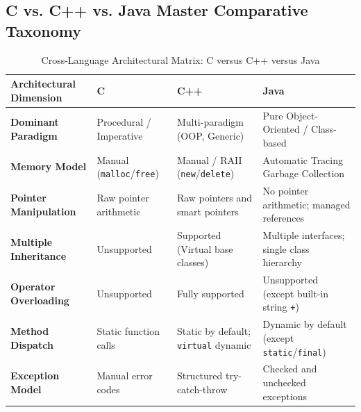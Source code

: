 \subsection{C vs. C++ vs. Java Master Comparative Taxonomy}
\begin{table}[htbp]
\centering
\small
\begin{tabularx}{\textwidth}{l X X X}
\toprule
\textbf{Architectural Dimension} & \textbf{C} & \textbf{C++} & \textbf{Java} \\
\midrule
\textbf{Dominant Paradigm} & Procedural / Imperative & Multi-paradigm (OOP, Generic) & Pure Object-Oriented / Class-based \\
\textbf{Memory Model} & Manual (\texttt{malloc}/\texttt{free}) & Manual / RAII (\texttt{new}/\texttt{delete}) & Automatic Tracing Garbage Collection \\
\textbf{Pointer Manipulation} & Raw pointer arithmetic & Raw pointers and smart pointers & No pointer arithmetic; managed references \\
\textbf{Multiple Inheritance} & Unsupported & Supported (Virtual base classes) & Multiple interfaces; single class hierarchy \\
\textbf{Operator Overloading} & Unsupported & Fully supported & Unsupported (except built-in string \texttt{+}) \\
\textbf{Method Dispatch} & Static function calls & Static by default; \texttt{virtual} dynamic & Dynamic by default (except \texttt{static}/\texttt{final}) \\
\textbf{Exception Model} & Manual error codes & Structured try-catch-throw & Checked and unchecked exceptions \\
\bottomrule
\end{tabularx}
\caption{Cross-Language Architectural Matrix: C versus C++ versus Java}
\label{tab:c_cpp_java_matrix}
\end{table}

